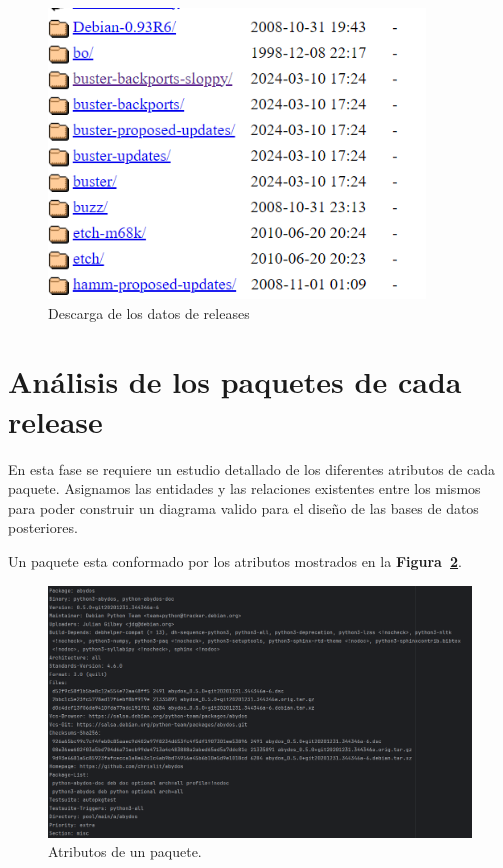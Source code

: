 \documentclass[a4paper, 12pt]{book}
\begin{document}
\begin{figure}[h]
	\centering
	\includegraphics[width=10cm, keepaspectratio]{img/releases.png}
	\caption{Descarga de los datos de releases}
	\label{fig:Descarga_releases}
\end{figure}

\section{Análisis de los paquetes de cada release} 
\label{sec:analisis_de_los_paquetes}

En esta fase se requiere un estudio detallado de los diferentes atributos de cada paquete. Asignamos las entidades y las relaciones existentes entre los mismos para poder construir un diagrama valido para el diseño de las bases de datos posteriores.

Un paquete esta conformado por los atributos mostrados en la \textbf {Figura~\ref{fig:paquete}}.

\begin{figure}[h]
	\centering
	\includegraphics[width=15cm, keepaspectratio]{img/paquete.png}
	\caption{Atributos de un paquete.}
	\label{fig:paquete}
\end{figure}
\end{document}
